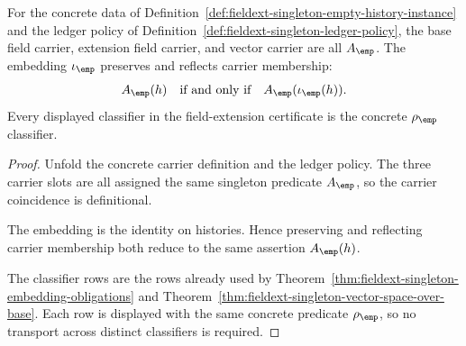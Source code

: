 \begin{theorem}
\label{thm:fieldext-singleton-carrier-coincidence}
For the concrete data of
Definition~\ref{def:fieldext-singleton-empty-history-instance} and the ledger
policy of Definition~\ref{def:fieldext-singleton-ledger-policy}, the base
field carrier, extension field carrier, and vector carrier are all
$A_{\emp}$. The embedding $\iota_{\emp}$ preserves and reflects carrier
membership:
$$
A_{\emp}(h)
\quad\text{if and only if}\quad
A_{\emp}(\iota_{\emp}(h)).
$$
Every displayed classifier in the field-extension certificate is the concrete
$\rho_{\emp}$ classifier.
\end{theorem}
\begin{proof}
Unfold the concrete carrier definition and the ledger policy. The three carrier
slots are all assigned the same singleton predicate $A_{\emp}$, so the carrier
coincidence is definitional.

The embedding is the identity on histories. Hence preserving and reflecting
carrier membership both reduce to the same assertion $A_{\emp}(h)$.

The classifier rows are the rows already used by
Theorem~\ref{thm:fieldext-singleton-embedding-obligations} and
Theorem~\ref{thm:fieldext-singleton-vector-space-over-base}. Each row is
displayed with the same concrete predicate $\rho_{\emp}$, so no transport
across distinct classifiers is required.
\end{proof}

